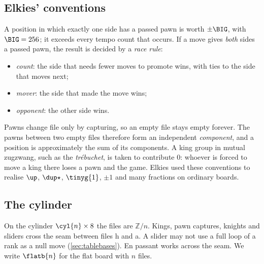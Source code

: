\subsection{Elkies' conventions}\label{sec:conventions}
\begin{convention}\label{conv:big}
A position in which exactly one side has a passed pawn is worth $\pm\BIG$, with $\BIG=256$; it exceeds every
tempo count that occurs. If a move gives \emph{both} sides a passed pawn, the result is decided by a
\emph{race rule}:
\begin{itemize}
\item \emph{count}: the side that needs fewer moves to promote wins, with ties to the side that moves next;
\item \emph{mover}: the side that made the move wins;
\item \emph{opponent}: the other side wins.
\end{itemize}
\end{convention}
Pawns change file only by capturing, so an empty file stays empty forever. The pawns between two empty files
therefore form an independent \emph{component}, and a position is approximately the sum of its components.
A king group in mutual zugzwang, such as the \emph{tr\'ebuchet}, is taken to contribute $0$: whoever is forced
to move a king there loses a pawn and the game. Elkies used these conventions to realise $\up$, $\dup\star$,
$\tinyg{1}$, $\pm1$ and many fractions on ordinary boards.

\subsection{The cylinder}
On the cylinder $\cyl{n}\times 8$ the files are $\mathbb{Z}/n$. Kings, pawn captures, knights and sliders
cross the seam between files h and a. A slider may not use a full loop of a rank as a null move
(\cref{sec:tablebases}). En passant works across the seam. We write $\flatb{n}$ for the flat board with $n$ files.
